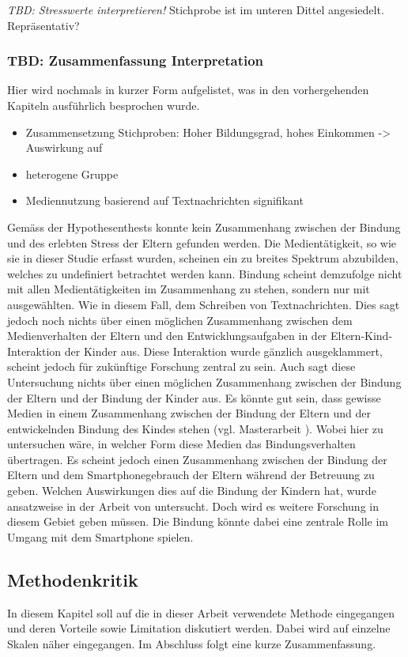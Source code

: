 \textit{TBD: Stresswerte interpretieren!} Stichprobe ist im unteren Dittel angesiedelt. Repräsentativ?

\subsubsection{TBD: Zusammenfassung Interpretation}
Hier wird nochmals in kurzer Form aufgelistet, was in den vorhergehenden Kapiteln ausführlich besprochen wurde.
\begin{itemize}
    \item Zusammensetzung Stichproben: Hoher Bildungsgrad, hohes Einkommen -> Auswirkung auf 
    \item heterogene Gruppe
    \item Mediennutzung basierend auf Textnachrichten signifikant
\end{itemize}
Gemäss der Hypothesenthests konnte kein Zusammenhang zwischen der Bindung und des erlebten Stress der Eltern gefunden werden. Die Medientätigkeit, so wie sie in dieser Studie erfasst wurden, scheinen ein zu breites Spektrum abzubilden, welches zu undefiniert betrachtet werden kann. Bindung scheint demzufolge nicht mit allen Medientätigkeiten im Zusammenhang zu stehen, sondern nur mit ausgewählten. Wie in diesem Fall, dem Schreiben von Textnachrichten. Dies sagt jedoch noch nichts über einen möglichen Zusammenhang zwischen dem Medienverhalten der Eltern und den Entwicklungsaufgaben in der Eltern-Kind-Interaktion der Kinder aus. Diese Interaktion wurde gänzlich ausgeklammert, scheint jedoch für zukünftige Forschung zentral zu sein. Auch sagt diese Untersuchung nichts über einen möglichen Zusammenhang zwischen der Bindung der Eltern und der Bindung der Kinder aus. Es könnte gut sein, dass gewisse Medien in einem Zusammenhang zwischen der Bindung der Eltern und der entwickelnden Bindung des Kindes stehen (vgl. Masterarbeit ). Wobei hier zu untersuchen wäre, in welcher Form diese Medien das Bindungsverhalten übertragen. Es scheint jedoch einen Zusammenhang zwischen der Bindung der Eltern und dem Smartphonegebrauch der Eltern während der Betreuung zu geben. Welchen Auswirkungen dies auf die Bindung der Kindern hat, wurde ansatzweise in der Arbeit von  untersucht. Doch wird es weitere Forschung in diesem Gebiet geben müssen. Die Bindung könnte dabei eine zentrale Rolle im Umgang mit dem Smartphone spielen.

\subsection{Methodenkritik} \label{sec:Methodenkritik}
In diesem Kapitel soll auf die in dieser Arbeit verwendete Methode eingegangen  und deren Vorteile sowie Limitation diskutiert werden. Dabei wird auf einzelne Skalen näher eingegangen. Im Abschluss folgt eine kurze Zusammenfassung.

